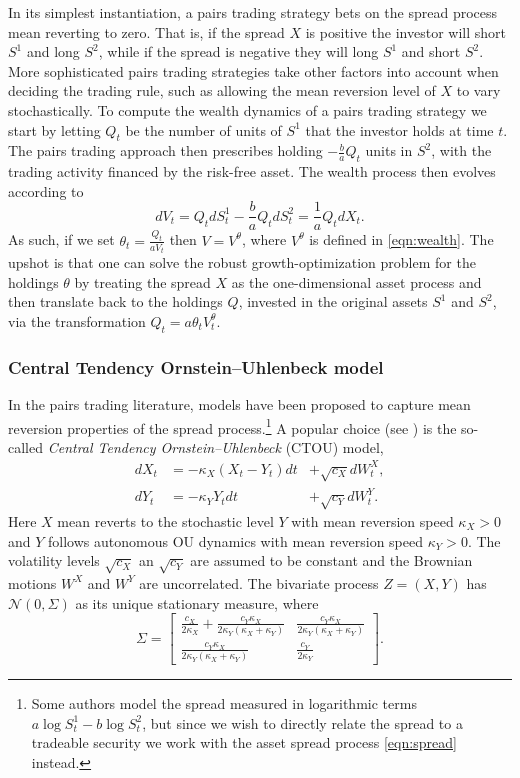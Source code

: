 \documentclass{article}
\theoremstyle{plain}
\theoremstyle{definition}
\newcommand{\Ncal}{{\mathcal N}}
\numberwithin{lem}{section}
\begin{document}
In its simplest instantiation, a pairs trading strategy bets on the spread process mean reverting to zero. That is, if the spread $X$ is positive the investor will short $S^1$ and long $S^2$, while if the spread is negative they will long $S^1$ and short $S^2$. More sophisticated pairs trading strategies take other factors into account when deciding the trading rule, such as allowing the mean reversion level of $X$ to vary stochastically. To compute the wealth dynamics of a pairs trading strategy we start by letting $Q_t$ be the number of units of $S^1$ that the investor holds at time $t$. The pairs trading approach then prescribes holding $-\frac{b}{a}Q_t$ units in $S^2$, with the trading activity financed by the risk-free asset. The wealth process then evolves according to
\[dV_t = Q_tdS^1_t - \frac{b}{a}Q_tdS^2_t = \frac{1}{a}Q_tdX_t.\]
As such, if we set $\theta_t = \frac{Q_t}{aV_t}$ then $V = V^\theta$, where $V^\theta$ is defined in \eqref{eqn:wealth}. The upshot is that one can solve the robust growth-optimization problem for the holdings $\theta$ by treating the spread $X$ as the one-dimensional asset process and then translate back to the holdings $Q$, invested in the original assets $S^1$ and $S^2$, via the transformation $Q_t = a\theta_tV_t^\theta$.
\subsubsection{Central Tendency Ornstein--Uhlenbeck model} \label{sec:pairs_CTOU}
In the pairs trading literature, models have been proposed to capture mean reversion properties of the spread process.\footnote{Some authors model the spread measured in logarithmic terms $a\log S^1_t - b\log S^2_t$, but since we wish to directly relate the spread to a tradeable security we work with the asset spread process \eqref{eqn:spread} instead.} A popular choice (see \cite{liu2017intraday,leung2018optimal}) is the so-called \emph{Central Tendency Ornstein--Uhlenbeck} (CTOU) model,
\begin{equation} \label{eqn:CTOU}
\begin{aligned}
    dX_t & = - \kappa_X(X_t-Y_t)dt&  + \sqrt{c_X} dW^X_t, \\
    dY_t & = -\kappa_YY_tdt&  + \sqrt{c_Y}dW^Y_t.
\end{aligned}
\end{equation}
Here $X$ mean reverts to the stochastic level $Y$ with mean reversion speed $\kappa_X > 0$ and $Y$ follows autonomous OU dynamics with mean reversion speed $\kappa_Y>0$. The volatility levels $\sqrt{c_X}$ an $\sqrt{c_Y}$ are assumed to be constant and the Brownian motions $W^X$ and $W^Y$ are uncorrelated. The bivariate process $Z = (X,Y)$ has $\Ncal(0,\Sigma)$ as its unique stationary measure, where
\begin{equation} \label{eqn:Sigma_pairs}
\Sigma = \begin{bmatrix} \frac{c_X}{2\kappa_X} + \frac{c_Y\kappa_X}{2\kappa_Y(\kappa_X+\kappa_Y)}& \frac{c_Y\kappa_X}{2\kappa_Y(\kappa_X+\kappa_Y)} \\ \frac{c_Y\kappa_X}{2\kappa_Y(\kappa_X+\kappa_Y)}
& \frac{c_Y}{2\kappa_Y}
\end{bmatrix}.
\end{equation}
\end{document}
